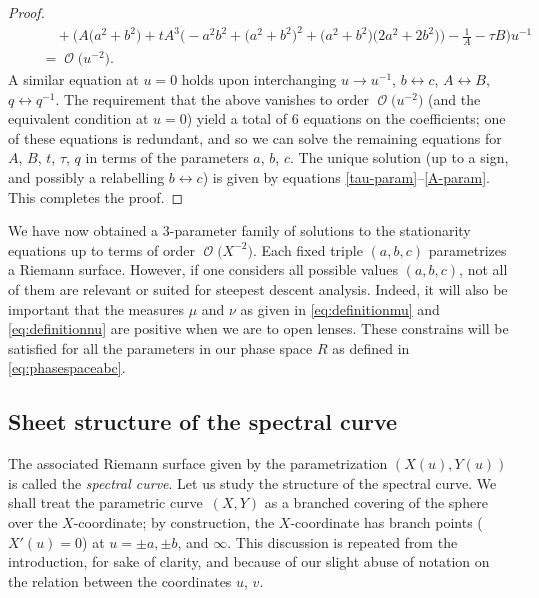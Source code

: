 \documentclass[pdftex]{sigma}
\DeclareMathOperator{\OO}{\mathcal{O}}
\numberwithin{equation}{section}
\begin{document}
\begin{proof}
\begin{gather*}
 \qquad\quad{}+ \biggl( A\bigl(a^2 + b^2\bigr) + t A^3\bigl(-a^2b^2 + \bigl(a^2 + b^2\bigr)^2 + \bigl(a^2 + b^2\bigr)\bigl(2a^2 + 2b^2\bigr)\bigr) - \frac{1}{A} - \tau B \biggr) u^{-1} \\
 \qquad{}= \OO\bigl(u^{-2}\bigr).
 \end{gather*}
A similar equation at $u=0$ holds upon interchanging $u\to u^{-1}$, $b\leftrightarrow c$, $A\leftrightarrow B$, $q\leftrightarrow q^{-1}$. The requirement that the above vanishes to order $\OO\bigl(u^{-2}\bigr)$ (and the equivalent condition at $u=0$) yield a total of $6$ equations on the coefficients; one of these equations is redundant, and so we can solve the remaining equations for $A$, $B$, $t$, $\tau$, $q$ in terms of the parameters $a$, $b$, $c$. The unique solution (up to a sign, and possibly a relabelling $b\leftrightarrow c$) is given by equations \eqref{tau-param}--\eqref{A-param}. This completes the proof.
\end{proof}

We have now obtained a $3$-parameter family of solutions to the stationarity equations up to terms of order $\OO\bigl(X^{-2}\bigr)$. Each fixed triple $(a,b,c)$ parametrizes a Riemann surface. However, if one considers all possible values $(a,b,c)$, not all of them are relevant or suited for steepest descent analysis. Indeed, it will also be important that the measures $\mu$ and $\nu$ as given in \eqref{eq:definitionmu} and \eqref{eq:definitionnu} are positive when we are to open lenses. These constrains will be satisfied for all the parameters in our phase space $R$ as defined in \eqref{eq:phasespaceabc}.

\subsection{Sheet structure of the spectral curve}


The associated Riemann surface given by the parametrization $(X(u),Y(u))$ is called the \textit{spectral curve}. Let us study the structure of the spectral curve. We shall treat the parametric curve~$(X,Y)$ as a branched covering of the sphere over the $X$-coordinate; by construction, the $X$-coordinate has branch points ($X'(u) = 0$) at $u = \pm a,\pm b$, and $\infty$. This discussion is repeated from the introduction, for sake of clarity, and because of our slight abuse of notation on the relation between the coordinates $u$, $v$.
\end{document}
